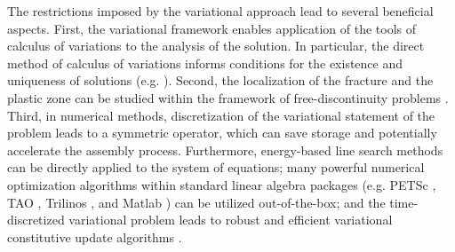 The restrictions imposed by the variational approach lead to several beneficial aspects. First, the variational framework enables application of the tools of calculus of variations to the analysis of the solution. In particular, the direct method of calculus of variations informs conditions for the existence and uniqueness of solutions (e.g. \cite{dal2012introduction}). Second, the localization of the fracture and the plastic zone can be studied within the framework of free-discontinuity problems \cite{braides1998approximation,gariepy2001functions}. Third, in numerical methods, discretization of the variational statement of the problem leads to a symmetric operator, which can save storage and potentially accelerate the assembly process. Furthermore, energy-based line search methods can be directly applied to the system of equations; many powerful numerical optimization algorithms within standard linear algebra packages (e.g. PETSc \cite{petsc-web-page}, TAO \cite{benson2003tao}, Trilinos \cite{heroux2005overview}, and Matlab \cite{higham2016matlab}) can be utilized out-of-the-box; and the time-discretized variational problem leads to robust and efficient variational constitutive update algorithms \cite{ortiz_1999}.
